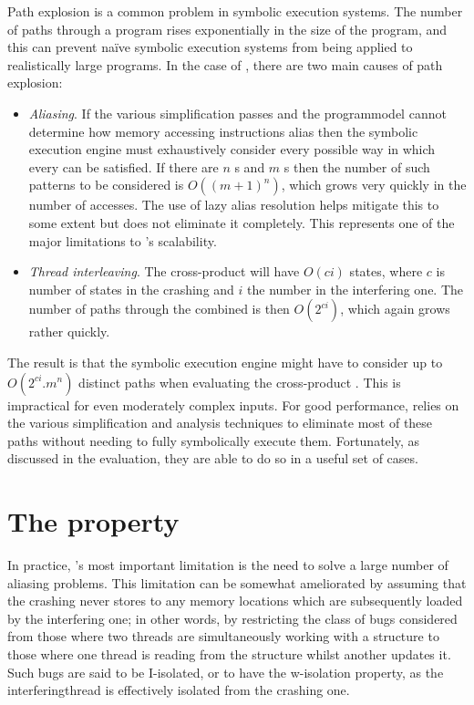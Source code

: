 Path explosion is a common problem in symbolic execution systems.  The
number of paths through a program rises exponentially in the size of
the program, and this can prevent na\"ive symbolic execution systems
from being applied to realistically large programs.  In the case of
\technique, there are two main causes of path explosion:
\begin{itemize}
\item
  \textit{Aliasing}.  If the various simplification passes and the
  \gls{programmodel} cannot determine how memory accessing
  instructions alias then the symbolic execution engine must
  exhaustively consider every possible way in which every 
  can be satisfied.  If there are $n$ s and $m$
  s then the number of such patterns to be considered is
  $O((m+1)^n)$, which grows very quickly in the number of accesses.
  The use of lazy alias resolution helps mitigate this to some extent
  but does not eliminate it completely.  This represents one of the
  major limitations to \technique's scalability.
\item
  \textit{Thread interleaving}.  The cross-product {\StateMachine}
  will have $O(ci)$ states, where $c$ is number of states in the
  crashing {\StateMachine} and $i$ the number in the interfering one.
  The number of paths through the combined {\StateMachine} is then
  $O(2^{ci})$, which again grows rather quickly.
\end{itemize}
The result is that the symbolic execution engine might have to
consider up to $O(2^{ci}.m^n)$ distinct paths when evaluating the
cross-product {\StateMachine}.  This is impractical for even
moderately complex inputs.  For good performance, {\technique} relies
on the various simplification and analysis techniques to eliminate
most of these paths without needing to fully symbolically execute
them.  Fortunately, as discussed in the evaluation, they are able to
do so in a useful set of cases.

\section{The  property}
\label{sect:derive:w_isolation}

In practice, {\technique}'s most important limitation is the need to
solve a large number of aliasing problems.  This limitation can be
somewhat ameliorated by assuming that the crashing {\StateMachine}
never stores to any memory locations which are subsequently loaded by
the interfering one; in other words, by restricting the class of bugs
considered from those where two threads are simultaneously working
with a structure to those where one thread is reading from the
structure whilst another updates it.  Such bugs are said to be
I-isolated, or to have the \gls{w-isolation} property, as the
\gls{interferingthread} is effectively isolated from the crashing one.

